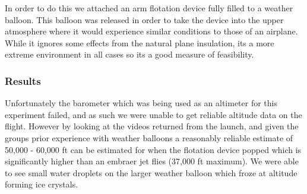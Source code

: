 In order to do this we attached an arm flotation device fully filled to a weather balloon. This balloon was released in order to take the device into the upper atmosphere where it would experience similar conditions to those of an airplane. While it ignores some effects from the natural plane insulation, its a more extreme environment in all cases so its a good measure of feasibility. \\

\subsubsection{Results}
Unfortunately the barometer which was being used as an altimeter for this experiment failed, and as such we were unable to get reliable altitude data on the flight. However by looking at the videos returned from the launch, and given the groups prior experience with weather balloons a reasonably reliable estimate of 50,000 - 60,000 ft can be estimated for when the flotation device popped which is significantly higher than an embraer jet flies (37,000 ft maximum). We were able to see small water droplets on the larger weather balloon which froze at altitude forming ice crystals.

